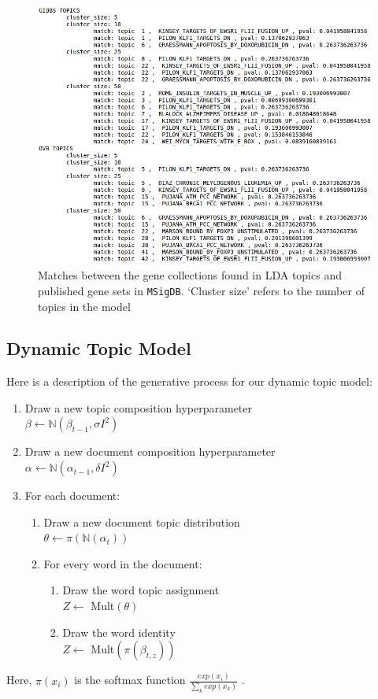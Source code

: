 \documentclass{article}
\begin{document}
\begin{figure}
    \centering
    \includegraphics[width=1\textwidth]{figs/pathways}
    \caption{Matches between the gene collections found in LDA topics and published gene sets in \texttt{MSigDB}. `Cluster size' refers to the number of topics in the model}
    \label{fig:pathways}
\end{figure}

\subsection{Dynamic Topic Model}
\label{dtmappendix}
Here is a description of the generative process for our dynamic topic model:
\begin{enumerate}
    \item Draw a new topic composition hyperparameter \\ $\beta \leftarrow \mathbb{N}(\beta_{t-1}, \sigma I^2)$
    \item Draw a new document composition hyperparameter \\ $\alpha \leftarrow \mathbb{N}(\alpha_{t-1}, \delta I^2)$
    \item For each document: 
    \begin{enumerate}
        \item Draw a new document topic distribution \\ $\theta \leftarrow \pi(\mathbb{N}(\alpha_t))$
        \item For every word in the document:
        \begin{enumerate}
            \item Draw the word topic assignment \\ $Z \leftarrow$ Mult$(\theta)$
            \item Draw the word identity \\ $Z \leftarrow$ Mult$(\pi(\beta_{t,z}))$
        \end{enumerate}
    \end{enumerate}
\end{enumerate}
Here, $\pi(x_i)$ is the softmax function $\frac{exp(x_i)}{\sum_k exp(x_k)}$ \cite{dtm}.
\end{document}
